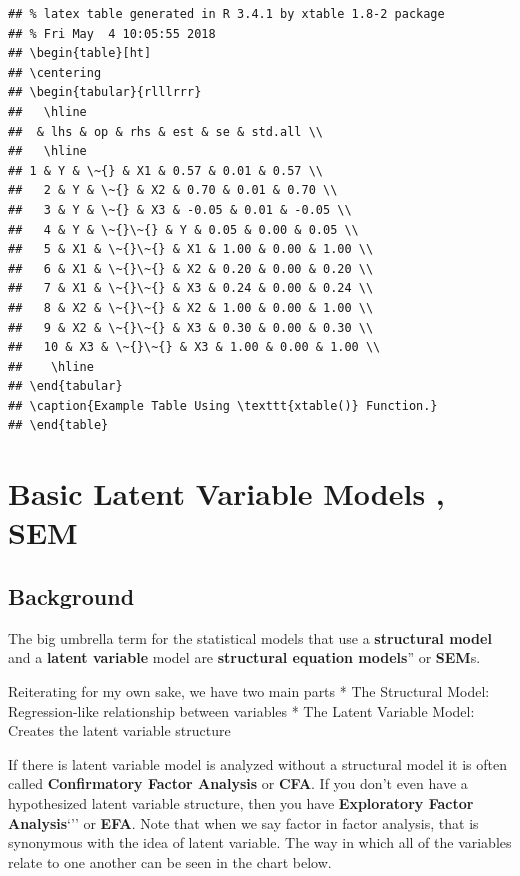 \documentclass[]{book}
\theoremstyle{definition}
\theoremstyle{definition}
\theoremstyle{definition}
\theoremstyle{remark}
\begin{document}
\begin{verbatim}
## % latex table generated in R 3.4.1 by xtable 1.8-2 package
## % Fri May  4 10:05:55 2018
## \begin{table}[ht]
## \centering
## \begin{tabular}{rlllrrr}
##   \hline
##  & lhs & op & rhs & est & se & std.all \\ 
##   \hline
## 1 & Y & \~{} & X1 & 0.57 & 0.01 & 0.57 \\ 
##   2 & Y & \~{} & X2 & 0.70 & 0.01 & 0.70 \\ 
##   3 & Y & \~{} & X3 & -0.05 & 0.01 & -0.05 \\ 
##   4 & Y & \~{}\~{} & Y & 0.05 & 0.00 & 0.05 \\ 
##   5 & X1 & \~{}\~{} & X1 & 1.00 & 0.00 & 1.00 \\ 
##   6 & X1 & \~{}\~{} & X2 & 0.20 & 0.00 & 0.20 \\ 
##   7 & X1 & \~{}\~{} & X3 & 0.24 & 0.00 & 0.24 \\ 
##   8 & X2 & \~{}\~{} & X2 & 1.00 & 0.00 & 1.00 \\ 
##   9 & X2 & \~{}\~{} & X3 & 0.30 & 0.00 & 0.30 \\ 
##   10 & X3 & \~{}\~{} & X3 & 1.00 & 0.00 & 1.00 \\ 
##    \hline
## \end{tabular}
## \caption{Example Table Using \texttt{xtable()} Function.} 
## \end{table}
\end{verbatim}

\section{Basic Latent Variable Models ,
SEM}\label{basic-latent-variable-models-sem}

\subsection{Background}\label{background-1}

The big umbrella term for the statistical models that use a
\textbf{structural model} and a \textbf{latent variable} model are
\textbf{structural equation models}'' or \textbf{SEM}s.

Reiterating for my own sake, we have two main parts * The Structural
Model: Regression-like relationship between variables * The Latent
Variable Model: Creates the latent variable structure

If there is latent variable model is analyzed without a structural model
it is often called \textbf{Confirmatory Factor Analysis} or
\textbf{CFA}. If you don't even have a hypothesized latent variable
structure, then you have \textbf{Exploratory Factor Analysis}`'' or
\textbf{EFA}. Note that when we say factor in factor analysis, that is
synonymous with the idea of latent variable. The way in which all of the
variables relate to one another can be seen in the chart below.
\end{document}

